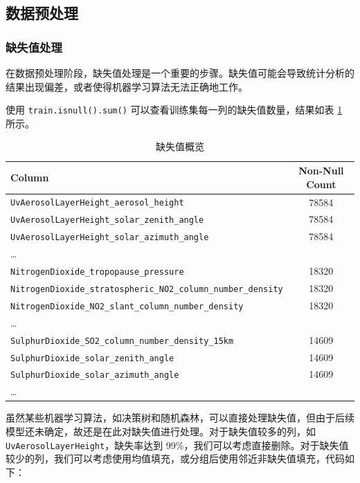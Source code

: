 \documentclass{ctexart}
\begin{document}
\subsection{数据预处理}

\subsubsection{缺失值处理}

在数据预处理阶段，缺失值处理是一个重要的步骤。缺失值可能会导致统计分析的结果出现偏差，或者使得机器学习算法无法正确地工作。

使用 \verb|train.isnull().sum()| 可以查看训练集每一列的缺失值数量，结果如表 \ref{tab:1} 所示。

\begin{table}[h]
      \centering
      \caption{缺失值概览}
      \label{tab:1}
      \begin{tabular}{lc}
      \hline
      Column & Non-Null Count \\ \hline
      \texttt{UvAerosolLayerHeight\_aerosol\_height} & 78584 \\
      \texttt{UvAerosolLayerHeight\_solar\_zenith\_angle} & 78584 \\
      \texttt{UvAerosolLayerHeight\_solar\_azimuth\_angle} & 78584 \\
      \ldots{} & \\
      \texttt{NitrogenDioxide\_tropopause\_pressure} & 18320 \\
      \texttt{NitrogenDioxide\_stratospheric\_NO2\_column\_number\_density} & 18320 \\
      \texttt{NitrogenDioxide\_NO2\_slant\_column\_number\_density} & 18320 \\
      \ldots{} & \\
      \texttt{SulphurDioxide\_SO2\_column\_number\_density\_15km} & 14609 \\
      \texttt{SulphurDioxide\_solar\_zenith\_angle} & 14609 \\
      \texttt{SulphurDioxide\_solar\_azimuth\_angle} & 14609 \\
      \ldots{} & \\
      \hline
      \end{tabular}
\end{table}

虽然某些机器学习算法，如决策树和随机森林，可以直接处理缺失值，但由于后续模型还未确定，故还是在此对缺失值进行处理。对于缺失值较多的列，如 \texttt{UvAerosolLayerHeight}，缺失率达到 99\%，我们可以考虑直接删除。对于缺失值较少的列，我们可以考虑使用均值填充，或分组后使用邻近非缺失值填充，代码如下：
\end{document}
